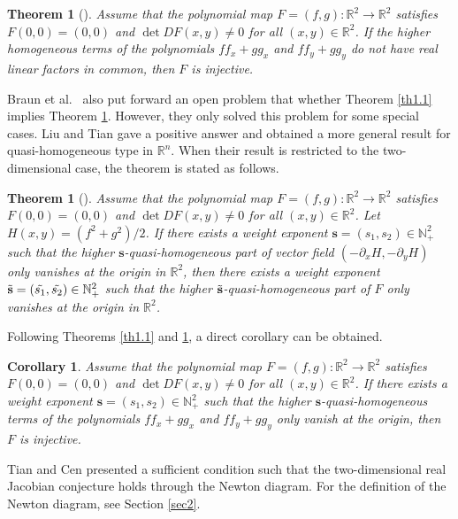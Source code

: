 \documentclass[10pt,a4paper]{amsart}
\numberwithin{equation}{section}
\newtheorem{theorem}[theo]{Theorem}
\newtheorem{corollary}[theo]{Corollary}
\begin{document}
\begin{theorem}[\cite{bib 7}] \label{th1.2}
Assume that the polynomial map $F=(f,g):\mathbb{R}^2 \to \mathbb{R}^2$ satisfies $ F(0,0)=(0,0) $ and $ \det DF(x,y)\neq 0 $ for all $ (x, y)\in \mathbb{R}^2 $. If the higher homogeneous terms of the polynomials $ ff_{x}+gg_{x} $ and $ ff_{y}+gg_{y} $ do not have real linear factors in common, then $F$ is injective.
\end{theorem}

Braun et al.\ \cite{bib 7} also put forward an open problem that whether Theorem \ref{th1.1} implies Theorem \ref{th1.2}. However, they only solved this problem for some special cases. Liu and Tian \cite{bib 19} gave a positive answer and obtained a more general result for quasi-homogeneous type in $\mathbb{R}^n$. When their result is restricted to the two-dimensional case, the theorem is stated as follows.

\begin{theorem}[\cite{bib 19}] \label{th1.3}
Assume that the polynomial map $F=(f,g):\mathbb{R}^2 \to \mathbb{R}^2$ satisfies 
$ F(0,0)=(0,0) $ and $ \det DF(x,y)\neq 0 $ for all $ (x,y)\in \mathbb{R}^2 $.
 Let $H(x,y)=(f^2+g^2)/2$. If there exists a weight exponent 
$\mathbf{s}=(s_1,s_2)\in \mathbb{N}_{+}^{2}$ such that the higher 
$\mathbf{s}$-quasi-homogeneous part of vector field $(-\partial_{x}H,-\partial_{y}H)$ 
only vanishes at the origin in $\mathbb{R}^2$, then there exists a weight exponent 
$\Tilde{\mathbf{s}}=(\Tilde{s_1},\Tilde{s_2})\in \mathbb{N}_{+}^{2}$ such that the higher 
$\Tilde{\mathbf{s}}$-quasi-homogeneous part of $F$ only vanishes at the origin in 
$\mathbb{R}^2$.
\end{theorem}

Following Theorems \ref{th1.1} and \ref{th1.3}, a direct corollary can be obtained.

\begin{corollary}\label{th1.5}
Assume that the polynomial map $F=(f,g):\mathbb{R}^2 \to \mathbb{R}^2$ satisfies 
$ F(0,0)=(0,0) $ and $ \det DF(x,y)\neq 0 $ for all $ (x, y)\in \mathbb{R}^2 $. 
If there exists a weight exponent $\mathbf{s}=(s_1,s_2)\in \mathbb{N}_{+}^{2}$ such 
that the higher $\mathbf{s}$-quasi-homogeneous terms of the polynomials $ ff_{x}+gg_{x} $ 
and $ ff_{y}+gg_{y} $ only vanish at the origin, then $F$ is injective.
\end{corollary}

Tian and Cen \cite{bib 25} presented a  sufficient condition such that the 
two-dimensional real Jacobian conjecture holds through the Newton diagram. 
For the definition of the Newton diagram, see Section \ref{sec2}.
\end{document}
